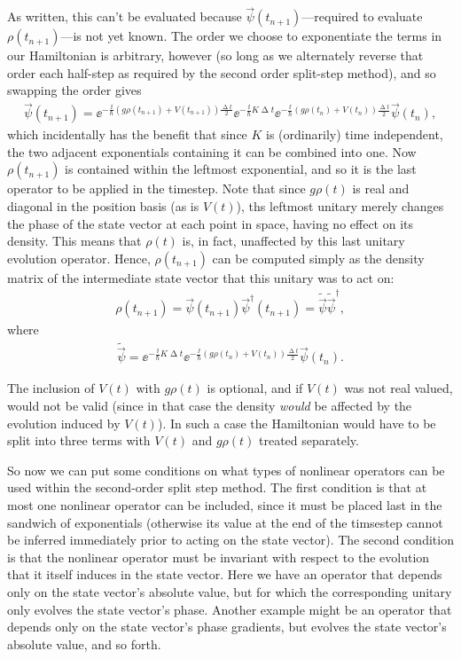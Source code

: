 As written, this can't be evaluated because $\vec \psi(t_{n+1})$---required to evaluate $\rho(t_{n+1})$---is not yet known. The order we choose to exponentiate the terms in our Hamiltonian is arbitrary, however (so long as we alternately reverse that order each half-step as required by the second order split-step method),
and so swapping the order gives
\begin{align}
\vec \psi(t_{n+1}) =
\ee^{-\frac\ii\hbar (g\rho(t_{n+1}) + V(t_{n+1})) \frac{\upDelta t} 2}
\ee^{-\frac\ii\hbar K \upDelta t}
\ee^{-\frac\ii\hbar (g\rho(t_n) + V(t_n) ) \frac{\upDelta t} 2}
\vec \psi(t_n),
\end{align}
which incidentally has the benefit that since $K$ is (ordinarily) time independent, the two adjacent exponentials containing it can be combined into one. Now $\rho(t_{n+1})$ is contained within the leftmost exponential, and so it is the last operator to be applied in the timestep. Note that since $g\rho(t)$ is real and diagonal in the position basis (as is $V(t)$), ths leftmost unitary merely changes the phase of the state vector at each point in space, having no effect on its density. This means that $\rho(t)$ is, in fact, unaffected by this last unitary evolution operator. Hence, $\rho(t_{n+1})$ can be computed simply as the density matrix of the intermediate state vector that this unitary was to act on:
\begin{align}
\rho(t_{n+1}) = \vec\psi(t_{n+1})\vec\psi^\dagger(t_{n+1}) = \tilde{\vec\psi}\tilde{\vec\psi}^\dagger,
\end{align}
where
\begin{align}
\tilde{\vec\psi} = 
\ee^{-\frac\ii\hbar K \upDelta t}
\ee^{-\frac\ii\hbar (g\rho(t_n) + V(t_n) ) \frac{\upDelta t} 2}
\vec \psi(t_n).
\end{align}

The inclusion of $V(t)$ with $g\rho(t)$ is optional, and if $V(t)$ was not real valued, would not be valid (since in that case the density \emph{would} be affected by the evolution induced by $V(t)$). In such a case the Hamiltonian would have to be split into three terms with $V(t)$ and $g\rho(t)$ treated separately.

So now we can put some conditions on what types of nonlinear operators can be used within the second-order split step method. The first condition is that at most one nonlinear operator can be included, since it must be placed last in the sandwich of exponentials (otherwise its value at the end of the timsestep cannot be inferred immediately prior to acting on the state vector). The second condition is that the nonlinear operator must be invariant with respect to the evolution that it itself induces in the state vector. Here we have an operator that  depends only on the state vector's absolute value, but for which the corresponding unitary only evolves the state vector's phase. Another example might be an operator that depends only on the state vector's phase gradients, but evolves the state vector's absolute value, and so forth.


